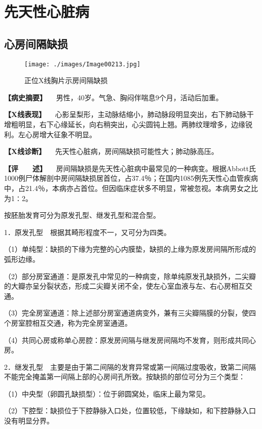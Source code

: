 \section{先天性心脏病}

\subsection{心房间隔缺损}

\begin{figure}[!htbp]
 \centering
 \texttt{[image: ./images/Image00213.jpg]}
 \captionsetup{justification=centering}
 \caption{正位X线胸片示房间隔缺损}
 \label{fig4-2-1}
  \end{figure} 

\textbf{【病史摘要】} 　男性，40岁。气急、胸闷伴喘息9个月，活动后加重。

\textbf{【X线表现】}
　心影呈梨形，主动脉结缩小，肺动脉段明显突出，右下肺动脉干增粗明显，右下心缘延长，向右稍突出，心尖圆钝上翘。两肺纹理增多，边缘锐利。左心房增大征象不明显。

\textbf{【X线诊断】} 　先天性心脏病，房间隔缺损可能性大；肺动脉高压。

\textbf{【评　　述】}
　房间隔缺损是先天性心脏病中最常见的一种病变。根据Abbott氏1000例尸体解剖中房间隔缺损居首位，占37.4％；在国内1085例先天性心血管疾病中，占21.4％，本病亦占首位。但因临床症状多不明显，常被忽视。本病男女之比为1∶2。

按胚胎发育可分为原发孔型、继发孔型和混合型。

1．原发孔型　根据其畸形程度不一，又可分为四类。

（1）单纯型：缺损的下缘为完整的心内膜垫，缺损的上缘为原发房间隔所形成的弧形边缘。

（2）部分房室通道：是原发孔中常见的一种病变，除单纯原发孔缺损外，二尖瓣的大瓣亦呈分裂状态，形成二尖瓣关闭不全，使左心室血液与左、右心房相互交通。

（3）完全房室通道：除上述部分房室通道病变外，兼有三尖瓣隔膜的分裂，使四个房室腔相互交通，称为完全房室通道。

（4）共同心房或称单心房腔：原发房间隔与继发房间隔均不发育，则形成共同心房。

2．继发孔型　主要是由于第二间隔的发育异常或第一间隔过度吸收，致第二间隔不能完全掩盖第一间隔上部的心房间孔所致。按缺损的部位可分为三个类型：

（1）中央型（卵圆孔缺损型）：位于卵圆窝处，临床上最为常见。

（2）下腔型：缺损位于下腔静脉入口处，位置较低，下缘缺如，和下腔静脉入口没有明显分界。

